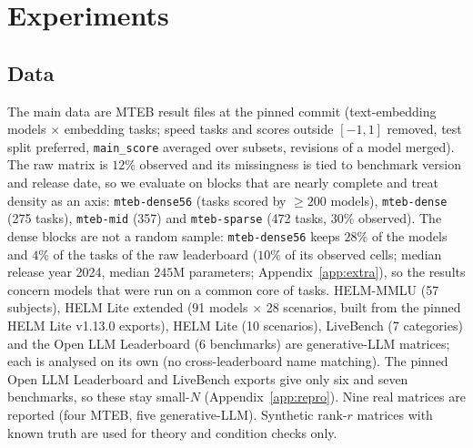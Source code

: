 \section{Experiments}
\label{sec:exp}
\subsection{Data}
\label{sec:data}
The main data are MTEB result files at the pinned commit (text-embedding models $\times$ embedding tasks; speed tasks and scores outside $[-1,1]$ removed, test split preferred, \texttt{main\_score} averaged over subsets, revisions of a model merged). The raw matrix is $12\%$ observed and its missingness is tied to benchmark version and release date, so we evaluate on blocks that are nearly complete and treat density as an axis: \texttt{mteb-dense56} (tasks scored by $\ge200$ models), \texttt{mteb-dense} (275 tasks), \texttt{mteb-mid} (357) and \texttt{mteb-sparse} (472 tasks, $30\%$ observed). The dense blocks are not a random sample: \texttt{mteb-dense56} keeps $28\%$ of the models and $4\%$ of the tasks of the raw leaderboard ($10\%$ of its observed cells; median release year 2024, median $245$M parameters; Appendix~\ref{app:extra}), so the results concern models that were run on a common core of tasks. HELM-MMLU (57 subjects), HELM Lite extended (91 models $\times$ 28 scenarios, built from the pinned HELM Lite v1.13.0 exports), HELM Lite (10 scenarios), LiveBench (7 categories) and the Open LLM Leaderboard (6 benchmarks) are generative-LLM matrices; each is analysed on its own (no cross-leaderboard name matching). The pinned Open LLM Leaderboard and LiveBench exports give only six and seven benchmarks, so these stay small-$N$ (Appendix~\ref{app:repro}). Nine real matrices are reported (four MTEB, five generative-LLM). Synthetic rank-$r$ matrices with known truth are used for theory and condition checks only.


